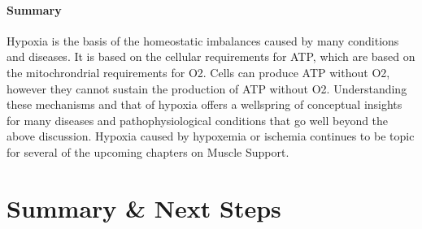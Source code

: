 \paragraph{Summary}
Hypoxia is the basis of the homeostatic imbalances caused by many conditions and diseases. It is based on the cellular requirements for ATP, which are based on the mitochrondrial requirements for O2. Cells can produce ATP without O2, however they cannot sustain the production of ATP without O2. Understanding these mechanisms and that of hypoxia offers a wellspring of conceptual insights for many diseases and pathophysiological conditions that go well beyond the above discussion. Hypoxia caused by hypoxemia or ischemia continues to be topic for several of the upcoming chapters on Muscle Support.



\section{Summary \& Next Steps}




\printbibliography[heading=subbibintoc]